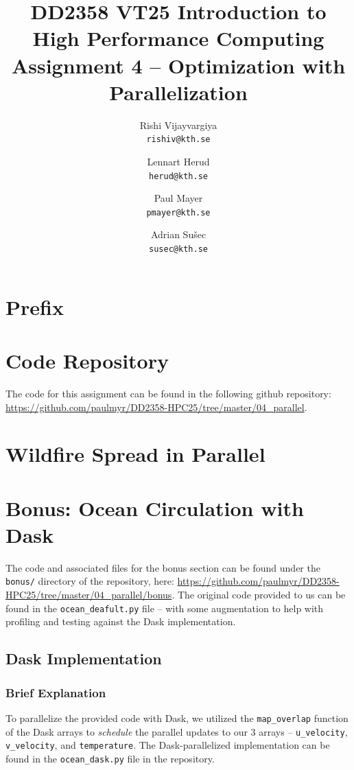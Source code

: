 \documentclass[a4paper,12pt]{article}
\title{
  \normalsize{DD2358 VT25 Introduction to}\\
  \normalsize{High Performance Computing}\\
  \large{Assignment 4 -- Optimization with Parallelization}\\
}
\author{
  \small Rishi Vijayvargiya\\[-0.75ex]
  \scriptsize\texttt{rishiv@kth.se}
  \and
  \small Lennart Herud\\[-0.75ex]
  \scriptsize\texttt{herud@kth.se}
  \and
  \small Paul Mayer\\[-0.75ex]
  \scriptsize\texttt{pmayer@kth.se}
  \and
  \small Adrian Sušec\\[-0.75ex]
  \scriptsize\texttt{susec@kth.se}
}
\date{}
\begin{document}
\maketitle
\thispagestyle{firstpagestyle}

\listoftodos

\vspace{1em}

%
\section*{Prefix}

%

\section{Code Repository}
The code for this assignment can be found in the following github repository: \url{https://github.com/paulmyr/DD2358-HPC25/tree/master/04_parallel}.

\section{Wildfire Spread in Parallel}
\section{Bonus: Ocean Circulation with Dask}
The code and associated files for the bonus section can be found under the \verb|bonus/| directory of the repository, here: \url{https://github.com/paulmyr/DD2358-HPC25/tree/master/04_parallel/bonus}. The original code provided to us can be found in the \verb|ocean_deafult.py| file -- with some augmentation to help with profiling and testing against the Dask implementation.

\subsection{Dask Implementation}

\subsubsection{Brief Explanation}
To parallelize the provided code with Dask, we utilized the \verb|map_overlap| function of the Dask arrays to \textit{schedule} the parallel updates to our 3 arrays -- \verb|u_velocity|, \verb|v_velocity|, and \verb|temperature|. The Dask-parallelized implementation can be found in the \verb|ocean_dask.py| file in the repository.
\end{document}
